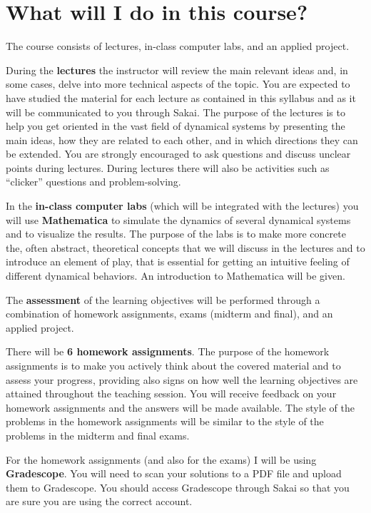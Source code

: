 \documentclass[11pt]{article}
\begin{document}


\section{What will I do in this course?}

The course consists of lectures, in-class computer labs, and an applied project. 

During the \textbf{lectures} the instructor will review the main relevant ideas and, in some cases, delve into more technical aspects of the topic. You are expected to have studied the material for each lecture as contained in this syllabus and as it will be communicated to you through Sakai. The purpose of the lectures is to help you get oriented in the vast field of dynamical systems by presenting the main ideas, how they are related to each other, and in which directions they can be extended. You are strongly encouraged to ask questions and discuss unclear points during lectures. During lectures there will also be activities such as “clicker” questions and problem-solving.

In the \textbf{in-class computer labs} (which will be integrated with the lectures) you will use \textbf{Mathematica} to simulate the dynamics of several dynamical systems and to visualize the results. The purpose of the labs is to make more concrete the, often abstract, theoretical concepts that we will discuss in the lectures and to introduce an element of play, that is essential for getting an intuitive feeling of different dynamical behaviors. An introduction to Mathematica will be given. 

The \textbf{assessment} of the learning objectives will be performed through a combination of homework assignments, exams (midterm and final), and an applied project. %

There will be \textbf{6 homework assignments}. The purpose of the homework assignments is to make you actively think about the covered material and to assess your progress, providing also signs on how well the learning objectives are attained throughout the teaching session. You will receive feedback on your homework assignments and the answers will be made available. The style of the problems in the homework assignments will be similar to the style of the problems in the midterm and final exams.

For the homework assignments (and also for the exams) I will be using \textbf{Gradescope}. You will need to scan your solutions to a PDF file and upload them to Gradescope. You should access Gradescope through Sakai so that you are sure you are using the correct account.
\end{document}
